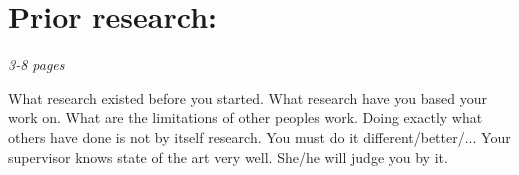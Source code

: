 \chapter{Prior research:}
\label{ch:prior}
\textit{3-8 pages}

What research existed before you started.
What research have you based your work on.
 What are the limitations of other peoples work.
Doing exactly what others have done is not by itself research.
You must do it different/better/...
Your supervisor knows state of the art very well. She/he will judge you by it.